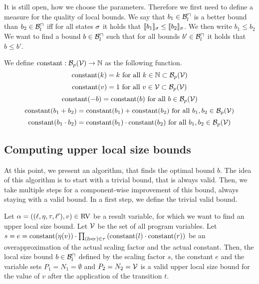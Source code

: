It is still open, how we choose the parameters.
Therefore we first need to define a measure for the quality of local bounds.
We say that $b_1 \in \mathcal{B}^\sqcap_l$ is a better bound than $b_2 \in \mathcal{B}^\sqcap_l$ iff for all states $\sigma$ it holds that $\llbracket b_1 \rrbracket_{\sigma} \leq \llbracket b_2 \rrbracket_{\sigma}$.
We then write $b_1 \leq b_2$
We want to find a bound $b \in \mathcal{B}^\sqcap_l$ such that for all bounds $b' \in \mathcal{B}^\sqcap_l$ it holds that $b \leq b'$.

\begin{definition}
  We define $\text{constant}: \mathcal{B}_p(\mathcal{V}) \rightarrow \mathbb{N}$ as the following function.
  \[ \text{constant}(k) = k \text{ for all } k \in \mathbb{N} \subset \mathcal{B}_p(\mathcal{V}) \] 
  \[ \text{constant}(v) = 1 \text{ for all } v \in \mathcal{V} \subset \mathcal{B}_p(\mathcal{V}) \] 
  \[ \text{constant}(-b) = \text{constant}(b) \text{ for all } b \in \mathcal{B}_p(\mathcal{V}) \] 
  \[ \text{constant}(b_1 + b_2) = \text{constant}(b_1) + \text{constant}(b_2) \text{ for all } b_1, b_2 \in \mathcal{B}_p(\mathcal{V}) \] 
  \[ \text{constant}(b_1 \cdot b_2) = \text{constant}(b_1) \cdot \text{constant}(b_2) \text{ for all } b_1, b_2 \in \mathcal{B}_p(\mathcal{V}) \] 
\end{definition}

\subsection{Computing upper local size bounds}

At this point, we present an algorithm, that finds the optimal bound $b$.
The idea of this algorithm is to start with a trivial bound, that is always valid.
Then, we take multiple steps for a component-wise improvement of this bound, always staying with a valid bound.
In a first step, we define the trivial valid bound.

\begin{definition}
  Let $\alpha = ((\ell,\eta,\tau,\ell'),v) \in \text{RV}$ be a result variable, for which we want to find an upper local size bound.
  Let $\mathcal{V}$ be the set of all program variables.
  Let $s = e = \text{constant}(\eta(v)) \cdot \prod_{(l \bowtie r) \in \tau} \left( \text{constant}(l) \cdot \text{constant}(r) \right)$ be an overapproximation of the actual scaling factor and the actual constant.
  Then, the local size bound $b \in \mathcal{B}^\sqcap_l$ defined by the scaling factor $s$, the constant $e$ and the variable sets $P_1 = N_1 = \emptyset$ and $P_2 = N_2 = \mathcal{V}$ is a valid upper local size bound for the value of $v$ after the application of the transition $t$.
\end{definition}

